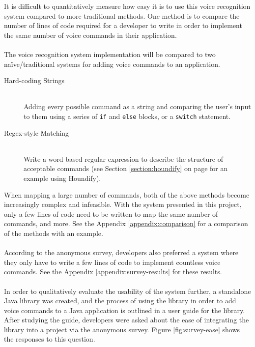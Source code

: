 \documentclass[11pt]{article}
\begin{document}
It is difficult to quantitatively measure how easy it is to use this voice recognition system compared to more traditional methods. One method is to compare the number of lines of code required for a developer to write in order to implement the same number of voice commands in their application.
\\
\\
The voice recognition system implementation will be compared to two na\"ive/traditional systems for adding voice commands to an application.

\begin{description}
\item[Hard-coding Strings] \hfill \\ Adding every possible command as a string and comparing the user's input to them using a series of \texttt{if} and \texttt{else} blocks, or a \texttt{switch} statement.
\item[Regex-style Matching] \hfill \\ Write a word-based regular expression to describe the structure of acceptable commands (see Section \ref{section:houndify} on page \pageref{section:houndify} for an example using Houndify).
\end{description}

When mapping a large number of commands, both of the above methods become increasingly complex and infeasible. With the system presented in this project, only a few lines of code need to be written to map the same number of commands, and more. See the Appendix \ref{appendix:comparison} for a comparison of the methods with an example.
\\
\\
According to the anonymous survey, developers also preferred a system where they only have to write a few lines of code to implement countless voice commands. See the Appendix \ref{appendix:survey-results} for these results.
\\
\\
In order to qualitatively evaluate the usability of the system further, a standalone Java library was created, and the process of using the library in order to add voice commands to a Java application is outlined in a user guide for the library. After studying the guide, developers were asked about the ease of integrating the library into a project via the anonymous survey. Figure \ref{fig:survey-ease} shows the responses to this question.
\end{document}
